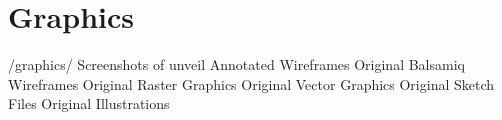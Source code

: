 \section{Graphics}

\begin{FileList}{/graphics/}
 Screenshots of unveil %
  Annotated Wireframes%
 Original Balsamiq Wireframes%
 Original Raster Graphics %
 Original Vector Graphics %
 Original Sketch Files %
 Original Illustrations %
\end{FileList}

